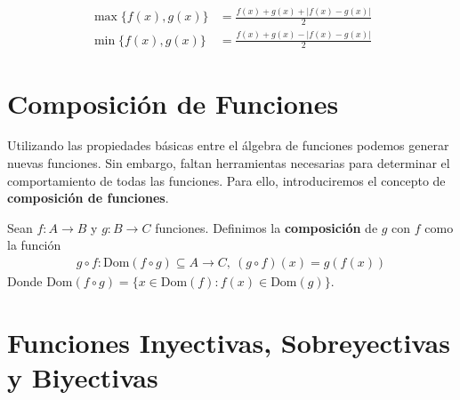 \documentclass[12pt]{book}
\begin{document}
\begin{align*}
    \max\{f(x),g(x)\}&= \frac{f(x)+g(x)+|f(x)-g(x)|}{2} \\
    \min\{f(x),g(x)\}&= \frac{f(x)+g(x)-|f(x)-g(x)|}{2}
\end{align*}

\section{Composición de Funciones}

Utilizando las propiedades básicas entre el álgebra de funciones podemos generar nuevas funciones. Sin embargo, faltan herramientas necesarias para determinar el comportamiento de todas las funciones. Para ello, introduciremos el concepto de \textbf{composición de funciones}.

\begin{defi}{}{}
    Sean $f: A \longrightarrow B$ y $g : B \longrightarrow C$ funciones. Definimos la \textbf{composición} de $g$ con $f$ como la función
\begin{align*}
        g \circ f : \text{Dom}(f \circ g)  \subseteq A\longrightarrow C, \ (g \circ f)(x)=g(f(x))
\end{align*}
Donde $\text{Dom}(f \circ g)= \{ x \in \text{Dom}(f) : f(x) \in \text{Dom}(g)\}$.
\end{defi}

\section{Funciones Inyectivas, Sobreyectivas y Biyectivas}
\end{document}
